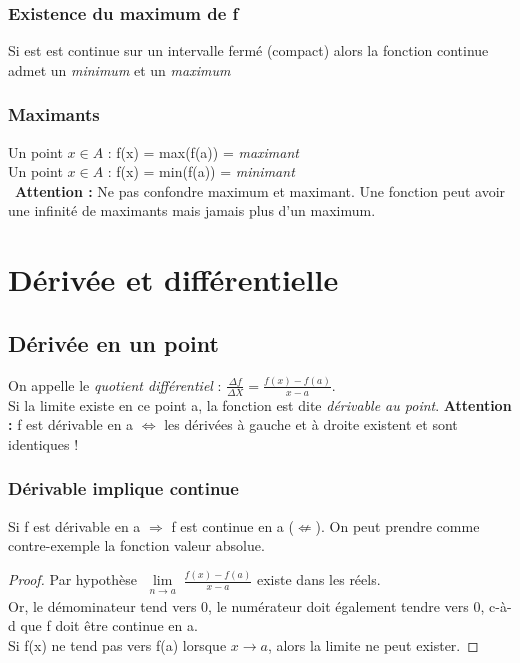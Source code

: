 \documentclass	[11pt, a4paper, openany]{book}
\begin{document}
\subsection{Existence du maximum de f}
Si est est continue sur un intervalle fermé (compact) alors la fonction continue admet un \textit{minimum} et un \textit{maximum}

\subsection{Maximants}
Un point $x \in A$ : f(x) = max(f(a)) = \textit{maximant}\\
Un point $x \in A$ : f(x) = min(f(a)) = \textit{minimant}\\\
\textbf{Attention :} Ne pas confondre maximum et maximant. Une fonction peut avoir une infinité de maximants mais jamais plus d'un maximum.



\chapter{Dérivée et différentielle}
\section{Dérivée en un point}
On appelle le \textit{quotient différentiel} : $\frac{\Delta f}{\Delta X} = \frac{f(x) - f(a)}{x - a}$. \\
Si la limite existe en ce point a, la fonction est dite \textit{dérivable au point}.
\textbf{Attention :} f est dérivable en a $\Leftrightarrow$ les dérivées à gauche et à droite existent et sont identiques !

\subsection*{Dérivable implique continue}
Si f est dérivable en a $\Rightarrow$ f est continue en a ($\nLeftarrow$). On peut prendre comme contre-exemple la fonction valeur absolue. 

\begin{proof}
Par hypothèse $\lim\limits_{\substack{n \to a}} \frac{f(x)-f(a)}{x-a}$ existe dans les réels.\\
Or, le démominateur tend vers 0, le numérateur doit également tendre vers 0, c-à-d que f doit être continue en a.\\
Si f(x) ne tend pas vers f(a) lorsque $x \rightarrow a $, alors la limite ne peut exister.
\end{proof}
\end{document}
